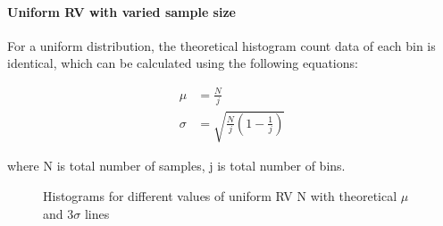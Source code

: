 \documentclass[11pt, twocolumn]{article}
\begin{document}
\paragraph{Uniform RV with varied sample size}
For a uniform distribution, the theoretical histogram count data of each bin is identical, which can be calculated using the following equations:

\vspace{-0.75em}
\begin{align*}
    \mu&=\frac{N}{j}\\
    \sigma&=\sqrt{\frac{N}{j}(1-\frac{1}{j})}
\end{align*}

where N is total number of samples, j is total number of bins.
\begin{figure}[htbp]
    \centering
    \vspace{-1em}

    \vspace{-1.1em}

    \vspace{-1.1em}
    \caption{Histograms for different values of uniform RV N with theoretical $\mu$ and 3$\sigma$ lines}
    \label{fig:q1_5}
\end{figure}
\vspace{-1em}
\end{document}
